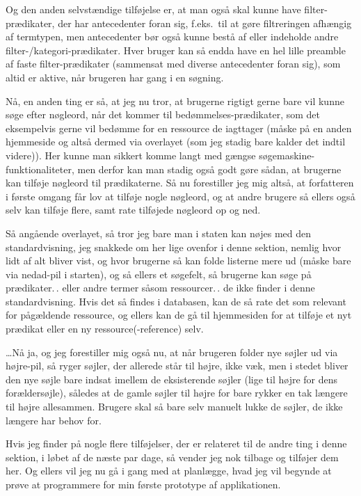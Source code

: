 \documentclass{report}
\begin{document}
Og den anden selvstændige tilføjelse er, at man også skal kunne have filter-prædikater, der har antecedenter foran sig, f.eks.\ til at gøre filtreringen afhængig af termtypen, men antecedenter bør også kunne bestå af eller indeholde andre filter-/kategori-prædikater. Hver bruger kan så endda have en hel lille preamble af faste filter-prædikater (sammensat med diverse antecedenter foran sig), som altid er aktive, når brugeren har gang i en søgning.

Nå, en anden ting er så, at jeg nu tror, at brugerne rigtigt gerne bare vil kunne søge efter nøgleord, når det kommer til bedømmelses-prædikater, som det eksempelvis gerne vil bedømme for en ressource de iagttager (måske på en anden hjemmeside og altså dermed via overlayet (som jeg stadig bare kalder det indtil videre)). Her kunne man sikkert komme langt med gængse søgemaskine-funktionaliteter, men derfor kan man stadig også godt gøre sådan, at brugerne kan tilføje nøgleord til prædikaterne. Så nu forestiller jeg mig altså, at forfatteren i første omgang får lov at tilføje nogle nøgleord, og at andre brugere så ellers også selv kan tilføje flere, samt rate tilføjede nøgleord op og ned. 

Så angående overlayet, så tror jeg bare man i staten kan nøjes med den standardvisning, jeg snakkede om her lige ovenfor i denne sektion, nemlig hvor lidt af alt bliver vist, og hvor brugerne så kan folde listerne mere ud (måske bare via nedad-pil i starten), og så ellers et søgefelt, så brugerne kan søge på prædikater.\,. eller andre termer såsom ressourcer.\,. de ikke finder i denne standardvisning. Hvis det så findes i databasen, kan de så rate det som relevant for pågældende ressource, og ellers kan de gå til hjemmesiden for at tilføje et nyt prædikat eller en ny ressource(-reference) selv. 

\ldots Nå ja, og jeg forestiller mig også nu, at når brugeren folder nye søjler ud via højre-pil, så ryger søjler, der allerede står til højre, ikke væk, men i stedet bliver den nye søjle bare indsat imellem de eksisterende søjler (lige til højre for dens forældersøjle), således at de gamle søjler til højre for bare rykker en tak længere til højre allesammen. Brugere skal så bare selv manuelt lukke de søjler, de ikke længere har behov for. 

Hvis jeg finder på nogle flere tilføjelser, der er relateret til de andre ting i denne sektion, i løbet af de næste par dage, så vender jeg nok tilbage og tilføjer dem her. Og ellers vil jeg nu gå i gang med at planlægge, hvad jeg vil begynde at prøve at programmere for min første prototype af applikationen.
\end{document}
